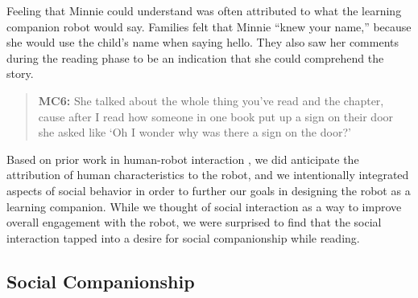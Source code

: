 \documentclass{sigchi}
\begin{document}
Feeling that Minnie could understand was often attributed to what the learning companion robot would say. Families felt that Minnie ``knew your name,'' because she would use the child's name when saying hello. They also saw her comments during the reading phase to be an indication that she could comprehend the story.

	\begin{quote}
		\textbf{MC6:} She talked about the whole thing you've read and the chapter, cause after I read how someone in one book put up a sign on their door she asked like `Oh I wonder why was there a sign on the door?'
	\end{quote} 

Based on prior work in human-robot interaction \cite{Duffy:2003}, we did anticipate the attribution of human characteristics to the robot, and we intentionally integrated aspects of social behavior in order to further our goals in designing the robot as a learning companion. While we thought of social interaction as a way to improve overall engagement with the robot, we were surprised to find that the social interaction tapped into a desire for social companionship while reading.

\subsection{Social Companionship}
\end{document}
